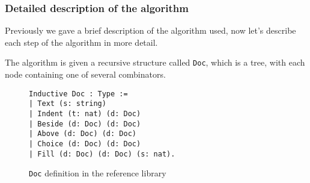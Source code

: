\documentclass[14pt]{constructor-diploma}
\begin{document}
\subsubsection{Detailed description of the algorithm}
Previously we gave a brief description of the algorithm used, 
now let's describe each step of the algorithm in more detail.

The algorithm is given a recursive structure called \texttt{Doc}, which is a tree, 
with each node containing one of several combinators.

\begin{figure}[H]
\begin{mdframed}[backgroundcolor=bg]
\begin{verbatim}
Inductive Doc : Type :=
| Text (s: string)
| Indent (t: nat) (d: Doc)
| Beside (d: Doc) (d: Doc)
| Above (d: Doc) (d: Doc)
| Choice (d: Doc) (d: Doc)
| Fill (d: Doc) (d: Doc) (s: nat).
\end{verbatim}
\end{mdframed}
\caption{\texttt{Doc} definition in the reference library~\cite{korolihin}}
\end{figure}
\end{document}
